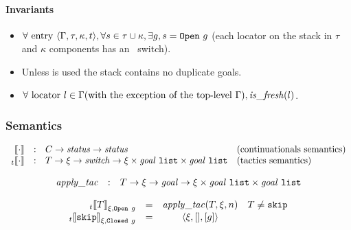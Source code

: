 \paragraph{Invariants}
\begin{itemize}
 \item $\forall~\mathrm{entry}~\langle\Gamma,\tau,\kappa,t\rangle, \forall s
  \in\tau\cup\kappa, \exists g, s = \mathtt{Open}~g$ (each locator on the stack in
  $\tau$ and $\kappa$ components has an \OPEN~switch).
 \item Unless \FOCUS{} is used the stack contains no duplicate goals.
 \item $\forall~\mathrm{locator}~l\in\Gamma \mbox{(with the exception of the
  top-level $\Gamma$)}, \mathit{is\_fresh}(l)$.
\end{itemize}

\subsubsection{Semantics}

\[
\begin{array}{rcll}
 |[\cdot|] & : & C -> \mathit{status} -> \mathit{status} &
  \mbox{(continuationals semantics)} \\
 {}_t|[\cdot|] & : & T -> \xi -> \mathit{switch} ->
  \xi\times\mathit{goal}~\mathtt{list}\times\mathit{goal}~\mathtt{list} & \mbox{(tactics semantics)} \\
\end{array}
\]

\[
\begin{array}{rcl}
 \mathit{apply\_tac} & : & T -> \xi -> \mathit{goal} ->
  \xi\times\mathit{goal}~\mathtt{list}\times\mathit{goal}~\mathtt{list}
\end{array}
\]

\[
\begin{array}{rlcc}
 {}_t|[T|]_{\xi,\mathtt{Open}~g} & = & \mathit{apply\_tac}(T,\xi,n) & T\neq\mathtt{skip}\\
 {}_t|[\mathtt{skip}|]_{\xi,\mathtt{Closed}~g} & = & \langle \xi, [], [g]\rangle &
\end{array}
\]

